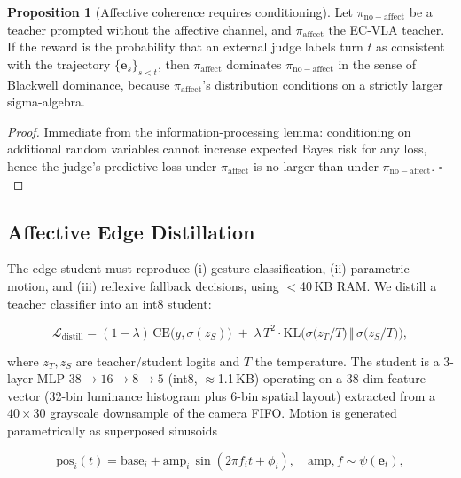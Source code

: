 \documentclass{article}
\newcommand{\cL}{\mathcal{L}}
\newcommand{\KL}{\text{KL}}
\theoremstyle{definition}
\newtheorem{proposition}{Proposition}[section]
\begin{document}
\begin{proposition}[Affective coherence requires conditioning]
Let $\pi_{\mathrm{no-affect}}$ be a teacher prompted without the affective
channel, and $\pi_{\mathrm{affect}}$ the EC-VLA teacher. If the reward is the
probability that an external judge labels turn $t$ as consistent with the
trajectory $\{\mathbf{e}_{s}\}_{s<t}$, then $\pi_{\mathrm{affect}}$ dominates
$\pi_{\mathrm{no-affect}}$ in the sense of Blackwell dominance, because
$\pi_{\mathrm{affect}}$'s distribution conditions on a strictly larger
sigma-algebra.
\end{proposition}

\begin{proof}
Immediate from the information-processing lemma: conditioning on additional
random variables cannot increase expected Bayes risk for any loss, hence the
judge's predictive loss under $\pi_{\mathrm{affect}}$ is no larger than under
$\pi_{\mathrm{no-affect}}$. $\square$
\end{proof}

\subsection{Affective Edge Distillation}

The edge student must reproduce (i) gesture classification, (ii) parametric
motion, and (iii) reflexive fallback decisions, using $<$40\,KB RAM. We distill
a teacher classifier into an int8 student:

\begin{equation}
\cL_{\text{distill}} = (1-\lambda)\,\mathrm{CE}\big(y, \sigma(z_S)\big)
\;+\; \lambda\, T^2 \cdot \KL\!\Big(
\sigma\big(z_T / T\big) \,\Vert\, \sigma\big(z_S / T\big)\Big),
\label{eq:distill}
\end{equation}

where $z_T, z_S$ are teacher/student logits and $T$ the temperature. The student
is a 3-layer MLP $38 \rightarrow 16 \rightarrow 8 \rightarrow 5$ (int8,
$\approx$1.1\,KB) operating on a 38-dim feature vector (32-bin luminance
histogram plus 6-bin spatial layout) extracted from a $40\times30$ grayscale
downsample of the camera FIFO. Motion is generated parametrically as
superposed sinusoids

\begin{equation}
\mathrm{pos}_i(t) = \mathrm{base}_i + \mathrm{amp}_i\,\sin(2\pi f_i t + \phi_i),
\quad \mathrm{amp}, f \sim \psi(\mathbf{e}_t),
\label{eq:motion}
\end{equation}
\end{document}
